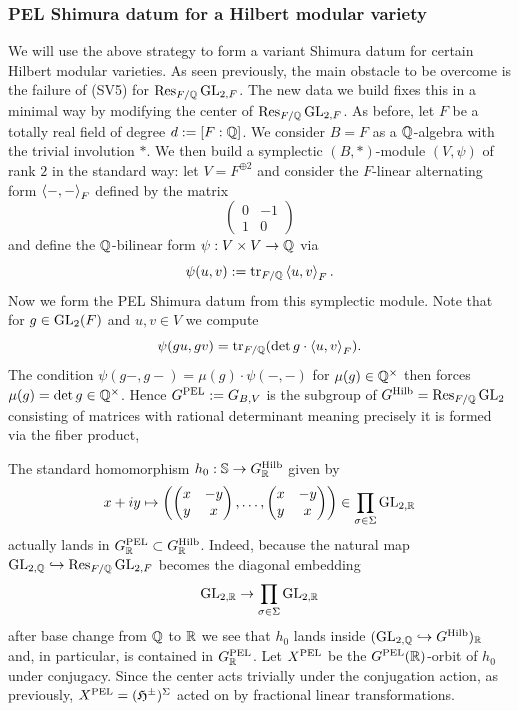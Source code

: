 \documentclass[main.tex]{subfiles}
\begin{document}
\subsubsection{PEL Shimura datum for a Hilbert modular variety} \label{section:PEL_variant}

We will use the above strategy to form a variant Shimura datum for certain Hilbert modular varieties. As seen previously, the main obstacle to be overcome is the failure of (SV5) for $\operatorname{\mathrm{Res}}_{F/\mathbb{Q}} \mathrm{GL}_{2, F}$. The new data we build fixes this in a minimal way by modifying the center of $\operatorname{\mathrm{Res}}_{F/\mathbb{Q}} \mathrm{GL}_{2, F}$.
As before, let $F$ be a totally real field of degree $d := [F : \mathbb{Q}]$. We consider $B = F$ as a $\mathbb{Q}$-algebra with the trivial involution $\ast$. We then build a symplectic $(B, \ast)$-module $(V, \psi)$ of rank $2$ in the standard way: let $V = F^{\oplus 2}$ and consider the $F$-linear alternating form $\left< -, - \right>_F$ defined by the matrix
\[ \begin{pmatrix}
0 & -1
\\
1 & 0
\end{pmatrix} \]
and define the $\mathbb{Q}$-bilinear form $\psi : V \times V \to \mathbb{Q}$ via
\[ \psi(u,v) := \operatorname{\mathrm{tr}}_{F/\mathbb{Q}} \left< u, v \right>_F. \]
Now we form the PEL Shimura datum from this symplectic module. Note that for $g \in \mathrm{GL}_2(F)$ and $u, v \in V$ we compute
\[ \psi(gu, gv) = \operatorname{\mathrm{tr}}_{F/\mathbb{Q}} (\det{g} \cdot \left< u, v \right>_F). \]
The condition $\psi(g-,g-) = \mu(g) \cdot \psi(-,-)$ for $\mu(g) \in \mathbb{Q}^\times$ then forces $\mu(g) = \det{g} \in \mathbb{Q}^\times$. Hence $G^{\mathrm{PEL}} := G_{B,V}$ is the subgroup of $G^{\operatorname{\mathrm{Hilb}}} = \operatorname{\mathrm{Res}}_{F/\mathbb{Q}} \mathrm{GL}_2$ consisting of matrices with rational determinant meaning precisely it is formed via the fiber product,
\begin{center}
\end{center}
The standard homomorphism $h_0 : \mathbb{S} \to G^{\operatorname{\mathrm{Hilb}}}_{\mathbb{R}}$ given by
\[ x + i y \mapsto \left( 
\begin{pmatrix}
x & -y
\\
y & x
\end{pmatrix},
\dots,
\begin{pmatrix}
x & -y
\\
y & x
\end{pmatrix} \right) \in \prod_{\sigma \in \Sigma} \mathrm{GL}_{2, \mathbb{R}} \]
actually lands in $G^{\mathrm{PEL}}_{\mathbb{R}} \subset G^{\operatorname{\mathrm{Hilb}}}_{\mathbb{R}}$. Indeed, because the natural map $\mathrm{GL}_{2,\mathbb{Q}} \hookrightarrow \operatorname{\mathrm{Res}}_{F/\mathbb{Q}} \mathrm{GL}_{2, F}$ becomes the diagonal embedding
\[ \mathrm{GL}_{2,\mathbb{R}} \to \prod_{\sigma \in \Sigma} \mathrm{GL}_{2, \mathbb{R}} \]
after base change from $\mathbb{Q}$ to $\mathbb{R}$ we see that $h_0$ lands inside $(\mathrm{GL}_{2,\mathbb{Q}} \hookrightarrow G^{\operatorname{\mathrm{Hilb}}})_{\mathbb{R}}$ and, in particular, is contained in $G_{\mathbb{R}}^{\mathrm{PEL}}$. Let $X^{\mathrm{PEL}}$ be the $G^{\mathrm{PEL}}(\mathbb{R})$-orbit of $h_0$ under conjugacy. Since the center acts trivially under the conjugation action, as previously, $X^{\mathrm{PEL}} = (\mathfrak{H}^{\pm})^{\Sigma}$ acted on by fractional linear transformations.
\end{document}
